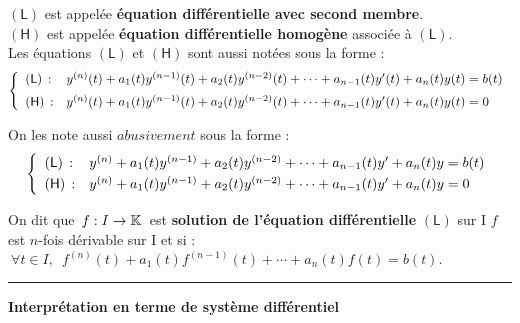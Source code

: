 \noindent $(\mathsf{L})$ est appelée \textbf{équation différentielle avec second membre}.\vspace{0.1cm}\\
$(\mathsf{H})$ est appelée \textbf{équation différentielle homogène} associée à $(\mathsf{L})$.\vspace{0.235cm}\\
Les équations $(\mathsf{L})$ et $(\mathsf{H})$ sont aussi notées sous la forme :\vspace{-0.1cm}
\[\left\{
\begin{array}{ll}
    (\mathsf{L})\,: & y^{(n)}(t)+a_1(t)y^{(n-1)}(t)+a_2(t)y^{(n-2)}(t)+\cdots+a_{n-1}(t)y'(t)+a_n(t)y(t)=b(t)\vspace{0.2cm}\\
    (\mathsf{H})\,: & y^{(n)}(t)+a_1(t)y^{(n-1)}(t)+a_2(t)y^{(n-2)}(t)+\cdots+a_{n-1}(t)y'(t)+a_n(t)y(t)=0
\end{array}
 \right.\]\vspace{0.2cm}

On les note aussi $abusivement$ sous la forme :
\[\left\{
\begin{array}{ll}
    (\mathsf{L})\,: & y^{(n)}+a_1(t)y^{(n-1)}+a_2(t)y^{(n-2)}+\cdots+a_{n-1}(t)y'+a_n(t)y=b(t)\vspace{0.1cm}\\
    (\mathsf{H})\,: & y^{(n)}+a_1(t)y^{(n-1)}+a_2(t)y^{(n-2)}+\cdots+a_{n-1}(t)y'+a_n(t)y=0
\end{array}
 \right.\]\vspace{2cm}

On dit que \(\,f:I\to \mathbb{K}\,\) est \textbf{solution de l'équation différentielle} $(\mathsf{L})$ sur I \ssi $f$\vspace{0.1cm}\\
est $n$-fois dérivable sur I et si : \(\ \forall t\in I,\ \; f^{(n)}(t)+a_1(t)f^{(n-1)}(t)+\cdots+a_n(t)f(t)=b(t).\)

\newpage

\hrule

\vspace{1cm}

\begin{center}\textbf{Interprétation en terme de système différentiel}\end{center}

\vspace{0.7cm}

